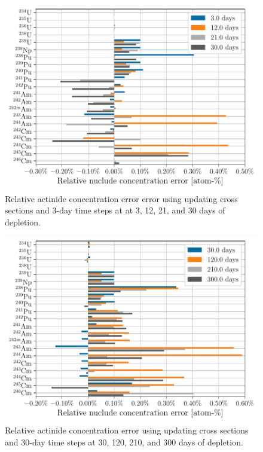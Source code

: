     \begin{figure}[htpb]
        \centering
        \includegraphics[width=\linewidth]{figs/actinides_updating_xs_predictor_fission_q_days.pdf}
        \caption{Relative actinide concentration error error using updating
        cross sections and 3-day time steps at at 3, 12, 21, and 30 days of
        depletion.}
        \label{fig:actinides-error-updating-xs-days}
    \end{figure}

    \begin{figure}[htpb]
        \centering
        \includegraphics[width=\linewidth]{figs/actinides_updating_xs_predictor_fission_q_months.pdf}
        \caption{Relative actinide concentration error using updating cross
        sections and 30-day time steps at 30, 120, 210, and 300 days of
        depletion.}
        \label{fig:actinides-error-updating-xs-months}
    \end{figure}


